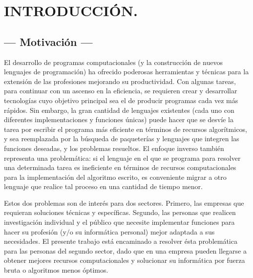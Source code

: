 \documentclass[11pt,a4paper]{article}
\begin{document}
\portada

\section{INTRODUCCIÓN.} %

\subsection{--- Motivación ---} %
\label{sub:motivacion}
El desarrollo de programas computacionales (y la construcción de nuevos lenguajes de programación) ha ofrecido poderosas herramientas y técnicas para la extensión de las profesiones mejorando su productividad.
Con algunas tareas, para continuar con un ascenso en la eficiencia, se requieren crear y desarrollar tecnologías cuyo objetivo principal sea el de producir programas cada vez más rápidos.
Sin embargo, la gran cantidad de lenguajes existentes (cada uno con diferentes implementaciones y funciones únicas) puede hacer que se desvíe la tarea por escribir el programa más eficiente en términos de recursos algorítmicos, y sea reemplazada por la búsqueda de paqueterías y lenguajes que integren las funciones deseadas, y los problemas resueltos.
El enfoque inverso también representa una problemática: si el lenguaje en el que se programa para resolver una determinada tarea es ineficiente en términos de recursos computacionales para la implementación del algoritmo escrito, es conveniente migrar a otro lenguaje que realice tal proceso en una cantidad de tiempo menor.

Estos dos problemas son de interés para dos sectores.
Primero, las empresas que requieran soluciones técnicas y específicas.
Segundo, las personas que realicen investigación individual y el público que necesite implementar funciones para hacer su profesión (y\(/\)o su informática personal) mejor adaptada a sus necesidades.
El presente trabajo está encaminado a resolver ésta problemática para las personas del segundo sector, dado que en una empresa pueden llegarse a obtener mejores recursos computacionales y solucionar su informática por fuerza bruta o algoritmos menos óptimos.
\end{document}
